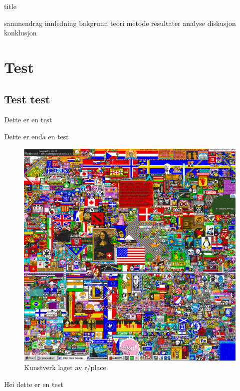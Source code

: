 



{title}
\newpage

\tableofcontents
\listoffigures
\listoftables
\lstlistoflistings
\newpage


{sammendrag}
{innledning}
{bakgrunn}
{teori}
{metode}
{resultater}
{analyse}
{diskusjon}
{konklusjon}

\section{Test}
\subsection{Test test}
Dette er en test

Dette er enda en test
    
    \begin{figure}[h]\label{r/place}
        \centering
        \includegraphics[width=.6\textwidth]{img/r_place.png}
        \caption{Kunstverk laget av r/place.}
    \end{figure}

    Hei dette er en test    
    
    \newpage

\printbibliography[heading=bibintoc]
    


